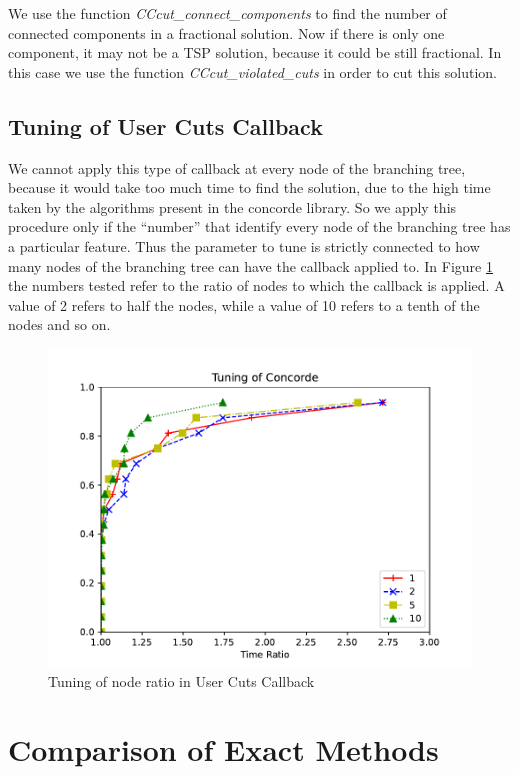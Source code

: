 We use the function \textit{CCcut\_connect\_components} to find the number of connected components in a fractional solution. Now if there is only one component, it may not be a TSP solution, because it could be still fractional. In this case we use the function \textit{CCcut\_violated\_cuts} in order to cut this solution.\\


\subsection{Tuning of User Cuts Callback}
We cannot apply this type of callback at every node of the branching tree, because it would take too much time to find the solution, due to the high time taken by the algorithms present in the concorde library. So we apply this procedure only if the “number” that identify every node of the branching tree has a particular feature.
Thus the parameter to tune is strictly connected to how many nodes of the branching tree can have the callback applied to.
In Figure \ref{fig:concorde} the numbers tested refer to the ratio of nodes to which the callback is applied. A value of 2 refers to half the nodes, while a value of 10 refers to a tenth of the nodes and so on.

\begin{figure}[!h]
    \centering
    \includegraphics[width=\textwidth]{images/concorde.pdf}
    \caption{Tuning of node ratio in User Cuts Callback}
    \label{fig:concorde}
\end{figure}

\section{Comparison of Exact Methods}

